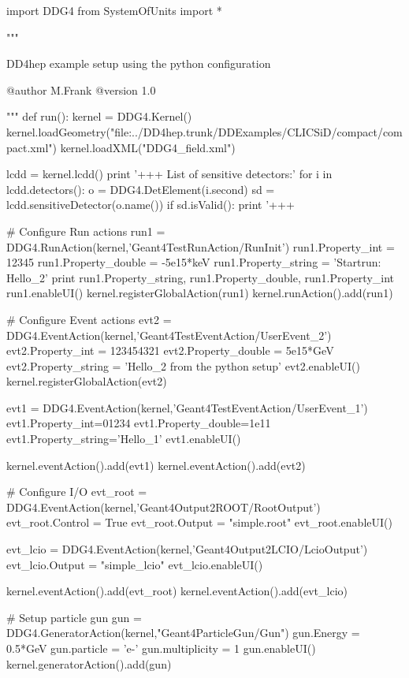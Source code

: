 \begin{code}
import DDG4
from SystemOfUnits import *

"""

   DD4hep example setup using the python configuration

   @author  M.Frank
   @version 1.0

"""
def run():
  kernel = DDG4.Kernel()
  kernel.loadGeometry("file:../DD4hep.trunk/DDExamples/CLICSiD/compact/compact.xml")
  kernel.loadXML("DDG4_field.xml")

  lcdd = kernel.lcdd()
  print '+++   List of sensitive detectors:'
  for i in lcdd.detectors(): 
    o = DDG4.DetElement(i.second)
    sd = lcdd.sensitiveDetector(o.name())
    if sd.isValid():
      print '+++  %

  # Configure Run actions
  run1 = DDG4.RunAction(kernel,'Geant4TestRunAction/RunInit')
  run1.Property_int    = 12345
  run1.Property_double = -5e15*keV
  run1.Property_string = 'Startrun: Hello_2'
  print run1.Property_string, run1.Property_double, run1.Property_int
  run1.enableUI()
  kernel.registerGlobalAction(run1)
  kernel.runAction().add(run1)

  # Configure Event actions
  evt2 = DDG4.EventAction(kernel,'Geant4TestEventAction/UserEvent_2')
  evt2.Property_int    = 123454321
  evt2.Property_double = 5e15*GeV
  evt2.Property_string = 'Hello_2 from the python setup'
  evt2.enableUI()
  kernel.registerGlobalAction(evt2)

  evt1 = DDG4.EventAction(kernel,'Geant4TestEventAction/UserEvent_1')
  evt1.Property_int=01234
  evt1.Property_double=1e11
  evt1.Property_string='Hello_1'
  evt1.enableUI()

  kernel.eventAction().add(evt1)
  kernel.eventAction().add(evt2)

  # Configure I/O
  evt_root = DDG4.EventAction(kernel,'Geant4Output2ROOT/RootOutput')
  evt_root.Control = True
  evt_root.Output = "simple.root"
  evt_root.enableUI()

  evt_lcio = DDG4.EventAction(kernel,'Geant4Output2LCIO/LcioOutput')
  evt_lcio.Output = "simple_lcio"
  evt_lcio.enableUI()

  kernel.eventAction().add(evt_root)
  kernel.eventAction().add(evt_lcio)

  # Setup particle gun
  gun = DDG4.GeneratorAction(kernel,"Geant4ParticleGun/Gun")
  gun.Energy   = 0.5*GeV
  gun.particle = 'e-'
  gun.multiplicity = 1
  gun.enableUI()
  kernel.generatorAction().add(gun)


\end{code}

